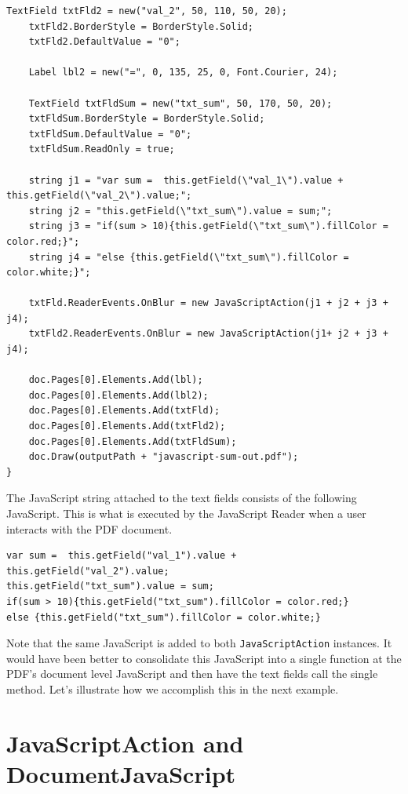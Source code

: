 \documentclass[american]{tufte-book}
\numberwithin{equation}{section}
\numberwithin{figure}{section}
\begin{document}
{{\begin{lstlisting}[caption={JavaScript that sums two values.},label={lis:JavaScript-that-sums},basicstyle={\footnotesize\ttfamily},breaklines=true]
    TextField txtFld2 = new("val_2", 50, 110, 50, 20);
    txtFld2.BorderStyle = BorderStyle.Solid;
    txtFld2.DefaultValue = "0";

    Label lbl2 = new("=", 0, 135, 25, 0, Font.Courier, 24);

    TextField txtFldSum = new("txt_sum", 50, 170, 50, 20);
    txtFldSum.BorderStyle = BorderStyle.Solid;
    txtFldSum.DefaultValue = "0";
    txtFldSum.ReadOnly = true;

    string j1 = "var sum =  this.getField(\"val_1\").value + this.getField(\"val_2\").value;";
    string j2 = "this.getField(\"txt_sum\").value = sum;";            
    string j3 = "if(sum > 10){this.getField(\"txt_sum\").fillColor = color.red;}";
    string j4 = "else {this.getField(\"txt_sum\").fillColor = color.white;}";

    txtFld.ReaderEvents.OnBlur = new JavaScriptAction(j1 + j2 + j3 + j4);            
    txtFld2.ReaderEvents.OnBlur = new JavaScriptAction(j1+ j2 + j3 + j4);

    doc.Pages[0].Elements.Add(lbl);
    doc.Pages[0].Elements.Add(lbl2);
    doc.Pages[0].Elements.Add(txtFld);
    doc.Pages[0].Elements.Add(txtFld2);
    doc.Pages[0].Elements.Add(txtFldSum);
    doc.Draw(outputPath + "javascript-sum-out.pdf");
}
\end{lstlisting}
\leavevmode\egroup

The JavaScript string attached to the text fields consists of the
following JavaScript. This is what is executed by the JavaScript Reader
when a user interacts with the PDF document.

\bgroup{}
\begin{lstlisting}[basicstyle={\footnotesize\ttfamily},breaklines=true]
var sum =  this.getField("val_1").value + this.getField("val_2").value;
this.getField("txt_sum").value = sum;           
if(sum > 10){this.getField("txt_sum").fillColor = color.red;}
else {this.getField("txt_sum").fillColor = color.white;}
\end{lstlisting}
\leavevmode\egroup

Note that the same JavaScript is added to both \texttt{JavaScriptAction}
instances. It would have been better to consolidate this JavaScript
into a single function at the PDF's document level JavaScript and
then have the text fields call the single method. Let's illustrate
how we accomplish this in the next example.

\section{JavaScriptAction and DocumentJavaScript}\label{sec:JavaScriptAction-and-DocumentJav}

}}
\end{document}
